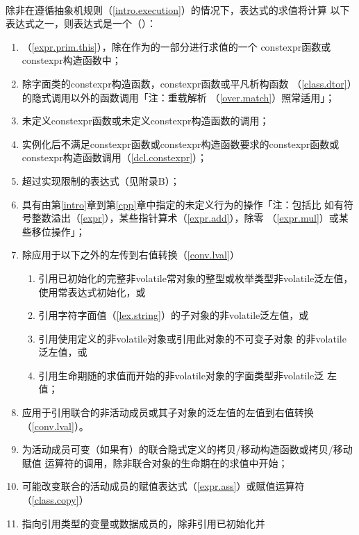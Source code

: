 \paragraph{}
除非在遵循抽象机规则（\ref{intro.execution}）的情况下，表达式的求值将计算
以下表达式之一，则表达式是一个（）：
\begin{enumerate}
  \item{（\ref{expr.prim.this}），除在作为的一部分进行求值的一个
    constexpr函数或constexpr构造函数中；}
  \item{除字面类的constexpr构造函数，constexpr函数或平凡析构函数
    （\ref{class.dtor}）的隐式调用以外的函数调用「注：重载解析
    （\ref{over.match}）照常适用」；}
  \item{未定义constexpr函数或未定义constexpr构造函数的调用；}
  \item{实例化后不满足constexpr函数或constexpr构造函数要求的constexpr函数或
    constexpr构造函数调用（\ref{dcl.constexpr}）；}
  \item{超过实现限制的表达式（见附录B）；}
  \item{具有由第\ref{intro}章到第\ref{cpp}章中指定的未定义行为的操作「注：包括比
    如有符号整数溢出（\ref{expr}），某些指针算术（\ref{expr.add}），除零
    （\ref{expr.mul}）或某些移位操作」；}
  \item{除应用于以下之外的左传到右值转换（\ref{conv.lval}）
    \begin{enumerate}
      \item{引用已初始化的完整非volatile常对象的整型或枚举类型非volatile泛左值，
        使用常表达式初始化，或}
      \item{引用字符字面值（\ref{lex.string}）的子对象的非volatile泛左值，或}
      \item{引用使用定义的非volatile对象或引用此对象的不可变子对象
        的非volatile泛左值，或}
      \item{引用生命期随的求值而开始的非volatile对象的字面类型非volatile泛
        左值；}
    \end{enumerate}}
  \item{应用于引用联合的非活动成员或其子对象的泛左值的左值到右值转换
    （\ref{conv.lval}）。}
  \item{为活动成员可变（如果有）的联合隐式定义的拷贝/移动构造函数或拷贝/移动赋值
    运算符的调用，除非联合对象的生命期在的求值中开始；}
  \item{可能改变联合的活动成员的赋值表达式（\ref{expr.ass}）或赋值运算符
    （\ref{class.copy}）}
  \item{指向引用类型的变量或数据成员的，除非引用已初始化并
}
\end{enumerate}
